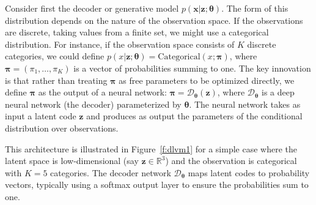 Consider first the decoder or generative model $p(\mathbf{x}|\mathbf{z}; \boldsymbol{\theta})$. The form of this distribution depends on the nature of the observation space. If the observations are discrete, taking values from a finite set, we might use a categorical distribution. For instance, if the observation space consists of $K$ discrete categories, we could define $p(x|\mathbf{z}; \boldsymbol{\theta}) = \text{Categorical}(x; \boldsymbol{\pi})$, where $\boldsymbol{\pi} = (\pi_1, \ldots, \pi_K)$ is a vector of probabilities summing to one. The key innovation is that rather than treating $\boldsymbol{\pi}$ as free parameters to be optimized directly, we define $\boldsymbol{\pi}$ as the output of a neural network: $\boldsymbol{\pi} = \mathcal{D}_{\boldsymbol{\theta}}(\mathbf{z})$, where $\mathcal{D}_{\boldsymbol{\theta}}$ is a deep neural network (the decoder) parameterized by $\boldsymbol{\theta}$. The neural network takes as input a latent code $\mathbf{z}$ and produces as output the parameters of the conditional distribution over observations.

This architecture is illustrated in Figure~\ref{f:dlvm1} for a simple case where the latent space is low-dimensional (say $\mathbf{z} \in \mathbb{R}^3$) and the observation is categorical with $K=5$ categories. The decoder network $\mathcal{D}_{\boldsymbol{\theta}}$ maps latent codes to probability vectors, typically using a softmax output layer to ensure the probabilities sum to one.

